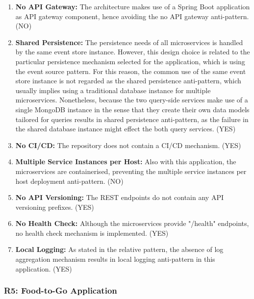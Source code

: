 \documentclass{Configuration_Files/PoliMi3i_thesis}
\begin{document}
\begin{enumerate}
    \item \textbf{No API Gateway:} The architecture makes use of a Spring Boot application as API gateway component, hence avoiding the no API gateway anti-pattern. (NO)
    
    \item \textbf{Shared Persistence:} The persistence needs of all microservices is handled by the same event store instance.
    However, this design choice is related to the particular persistence mechanism selected for the application, which is using the event source pattern.
    For this reason, the common use of the same event store instance is not regarded as the shared persistence anti-pattern, which usually implies using a traditional database instance for multiple microservices. 
    Nonetheless, because the two query-side services make use of a single MongoDB instance in the sense that they create their own data models tailored for queries results in shared persistence anti-pattern, as the failure in the shared database instance might effect the both query services. (YES)
    
    \item \textbf{No CI/CD:} The repository does not contain a CI/CD mechanism. (YES)
    
    \item \textbf{Multiple Service Instances per Host:} Also with this application, the microservices are containerised, preventing the multiple service instances per host deployment anti-pattern. (NO)
    
    \item \textbf{No API Versioning:} The REST endpoints do not contain any API versioning prefixes. (YES)
    
    \item \textbf{No Health Check:} Although the microservices provide "/health" endpoints, no health check mechanism is implemented. (YES)
    
    \item \textbf{Local Logging:} As stated in the relative pattern, the absence of log aggregation mechanism results in local logging anti-pattern in this application. (YES)
    
\end{enumerate}

\subsubsection{R5: Food-to-Go Application}
\label{subsubsec:R5}
\end{document}
